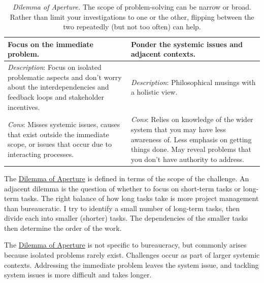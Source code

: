 \begin{center}
\begin{table}[H] %
\begin{tabular}{ | m{\dilemmatablewidth}| m{\dilemmatablewidth} | } 
  \hline
  \textbf{Focus on the immediate problem.} &
  \textbf{Ponder the systemic issues and adjacent contexts.} \\
  \hline
  \textit{Description}: Focus on isolated problematic aspects and don't worry about the interdependencies and feedback loops and stakeholder incentives. &
  \textit{Description}: Philosophical musings with a holistic view. \\
  \hline
  \textit{Cons}: Misses systemic issues, causes that exist outside the immediate scope, or issues that occur due to interacting processes. & 
  \textit{Cons}: Relies on knowledge of the wider system that you may have less awareness of. Less emphasis on getting things done. May reveal problems that you don't have authority to address. \\
  \hline
\end{tabular}
\caption{
\textit{Dilemma of Aperture.}
The scope of problem-solving can be narrow or broad. Rather than limit your investigations to one or the other, flipping between the two repeatedly (but not too often) can help.
}
\label{table:dilemma-personal-focus-vs-systemic}
\end{table}
\end{center}

The \hyperref[table:dilemma-personal-focus-vs-systemic]{Dilemma of Aperture} 
\iftoggle{printedonpaper}{ (\ref{table:dilemma-personal-focus-vs-systemic})}{}%
is defined in terms of the scope of the challenge. An adjacent dilemma is the question of whether to focus on short-term tasks or long-term tasks. The right balance of how long tasks take is more project management than bureaucratic. I try to identify a small number of long-term tasks, then divide each into smaller (shorter) tasks. The dependencies of the smaller tasks then determine the order of the work.

The \hyperref[table:dilemma-personal-focus-vs-systemic]{Dilemma of Aperture} is not specific to bureaucracy, but commonly arises because isolated problems rarely exist. Challenges occur as part of larger systemic contexts. Addressing the immediate problem leaves the system issue, and tackling system issues is more difficult and takes longer. 

